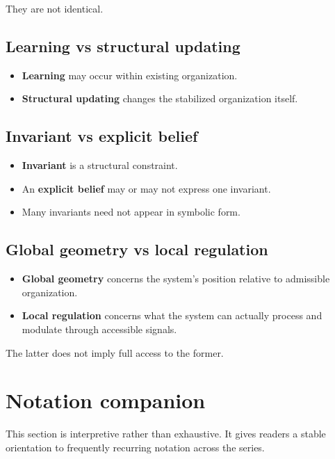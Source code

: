 \documentclass[11pt,a4paper]{article}
\begin{document}
	They are not identical.
	
	\subsection{Learning vs structural updating}
	
	\begin{itemize}[leftmargin=2em]
		\item \textbf{Learning} may occur within existing organization.
		\item \textbf{Structural updating} changes the stabilized organization itself.
	\end{itemize}
	
	\subsection{Invariant vs explicit belief}
	
	\begin{itemize}[leftmargin=2em]
		\item \textbf{Invariant} is a structural constraint.
		\item An \textbf{explicit belief} may or may not express one invariant.
		\item Many invariants need not appear in symbolic form.
	\end{itemize}
	
	\subsection{Global geometry vs local regulation}
	
	\begin{itemize}[leftmargin=2em]
		\item \textbf{Global geometry} concerns the system's position relative to admissible organization.
		\item \textbf{Local regulation} concerns what the system can actually process and modulate through accessible signals.
	\end{itemize}
	
	The latter does not imply full access to the former.
	
	\section{Notation companion}
	
	This section is interpretive rather than exhaustive. It gives readers a stable orientation to frequently recurring notation across the series.
	
\end{document}
